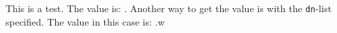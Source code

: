 \documentclass{article}
\begin{document}

    This is a test. The value is: .
    Another way to get the value is with the \texttt{dn}-list specified.
    The value in this case is: .w
\end{document}
